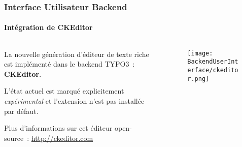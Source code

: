 \begin{frame}[fragile]
	\frametitle{Interface Utilisateur Backend}
	\framesubtitle{Intégration de CKEditor}

	\begin{columns}[T]
		\begin{column}{.5\textwidth}
			La nouvelle génération d'éditeur de texte riche est implémenté dans le backend TYPO3~:
			\textbf{CKEditor}.\newline

			L'état actuel est marqué explicitement \textit{expérimental} et l'extension
			n'est pas installée par défaut.\newline

			Plus d'informations sur cet éditeur open-source~: \url{http://ckeditor.com}
		\end{column}
		\begin{column}{.5\textwidth}
			\begin{figure}\vspace*{-0.4cm}
				\texttt{[image: BackendUserInterface/ckeditor.png]}
			\end{figure}
		\end{column}
	\end{columns}

\end{frame}



